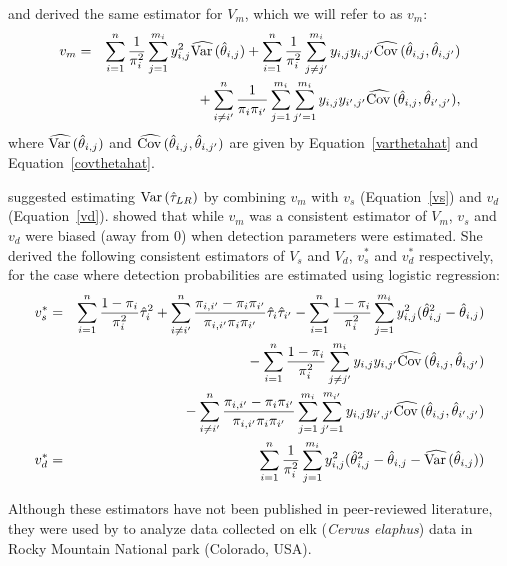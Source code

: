 \documentclass[nojss]{jss}
\def\VAR{{\rm Var}\,}
\def\COV{{\rm Cov}\,}
\begin{document}
 \citet{SS1989} and \citet{Wong1996} derived the same estimator for $V_{m}$, which we will refer to as $v_{m}$:
\begin{eqnarray}
 v_{m} & = & \sum_{i=1}^{n}\frac{1}{\pi_{i}^{2}}\sum_{j=1}^{m_{i}}y_{i,j}^{2}
 \widehat{\VAR}(\hat{\theta}_{i,j}) + \sum_{i=1}^{n}\frac{1}{\pi_{i}^{2}}\sum_{j \neq j'}^{m_{i}}y_{i,j}y_{i,j'}\widehat{\COV}(\hat{\theta}_{i,j},\hat{\theta}_{i,j'}) \nonumber \\
\label{vm} & & \mbox{} + \sum_{i \neq
i'}^{n}\frac{1}{\pi_{i}\pi_{i'}}\sum_{j=1}^{m_{i}}\sum_{j'=1}^{m_{i}}y_{i,j}y_{i',j'}\widehat{\COV}(\hat{\theta}_{i,j},\hat{\theta}_{i',j'}),
\end{eqnarray}
where $\widehat{\VAR}(\hat{\theta}_{i,j})$ and
$\widehat{\COV}(\hat{\theta}_{i,j},\hat{\theta}_{i,j'})$ are given
by Equation~\ref{varthetahat} and Equation~\ref{covthetahat}.

\citet{SS1989} suggested estimating $\VAR(\hat{\tau}_{LR})$ by
combining $v_{m}$ with $v_{s}$ (Equation~\ref{vs}) and $v_{d}$
(Equation~\ref{vd}).  \citet{Wong1996} showed that while $v_{m}$ was
a consistent estimator of $V_{m}$, $v_{s}$ and $v_{d}$ were biased
(away from 0) when detection parameters were estimated. She derived
the following consistent estimators of $V_{s}$ and $V_{d}$,
$v_{s}^{*}$ and $v_{d}^{*}$ respectively,
 for the case where detection probabilities are estimated using logistic regression:
\begin{eqnarray}
v_{s}^{*} & = &
\sum_{i=1}^{n}\frac{1-\pi_{i}}{\pi_{i}^{2}}\hat{\tau}_{i}^{2}+\sum_{i
\neq
i'}^{n}\frac{\pi_{i,i'}-\pi_{i}\pi_{i'}}{\pi_{i,i'}\pi_{i}\pi_{i'}}\hat{\tau}_{i}\hat{\tau}_{i'}
-
 \sum_{i=1}^{n}\frac{1-\pi_{i}}{\pi_{i}^{2}}\sum_{j=1}^{m_{i}}y_{i,j}^2(\hat{\theta}_{i,j}^{2}-\hat{\theta}_{i,j}) \nonumber \\
& & \mbox{} -\sum_{i=1}^{n}\frac{1-\pi_{i}}{\pi_{i}^{2}}\sum_{j \neq j'}^{m_{i}}y_{i,j}y_{i,j'}\widehat{\COV}(\hat{\theta}_{i,j}, \hat{\theta}_{i,j'}) \nonumber \\
& & \mbox{} - \sum_{i \neq i'}^{n}\frac{\pi_{i,i'}-\pi_{i}\pi_{i'}}{\pi_{i,i'}\pi_{i}\pi_{i'}}\sum_{j=1}^{m_{i}}\sum_{j'=1}^{m_{i'}}y_{i,j}y_{i',j'}\widehat{\COV}(\hat{\theta}_{i,j},\hat{\theta}_{i',j'})\\
v_{d}^{*} & = &
\sum_{i=1}^{n}\frac{1}{\pi_{i}^{2}}\sum_{j=1}^{m_{i}}y_{i,j}^2(\hat{\theta}_{i,j}^{2}-\hat{\theta}_{i,j}-\widehat{\VAR}(\hat{\theta}_{i,j}))
\end{eqnarray}

Although these estimators have not been published in peer-reviewed
literature, they were used by \citet{Lubow2002} to analyze data
collected on elk (\emph{Cervus elaphus}) data in Rocky Mountain
National park (Colorado, USA).
\end{document}
